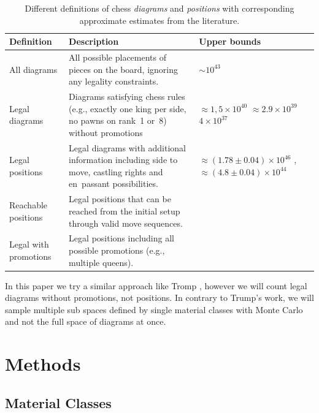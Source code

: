 \documentclass[12pt]{article}
\begin{document}
\begin{table}[h!]
\centering
\renewcommand{\arraystretch}{1.3}
\begin{tabular}{p{3.8cm} p{6.2cm} p{4.9cm}}
\toprule
\textbf{Definition} & \textbf{Description} & \textbf{Upper bounds} \\
\midrule
All diagrams & All possible placements of pieces on the board, ignoring any legality constraints. 
& $\sim 10^{43}$ \cite{shannon1950} \\[0.3em]

Legal diagrams & Diagrams satisfying chess rules (e.g., exactly one king per side, no pawns on rank~1 or~8) without promotions 
& $\approx 1,5\times10^{40}$ \cite{steinerberger2015} $\approx 2.9\times10^{39}$ \cite{tromp2021b} $4\times 10^{37}$ \cite{gourion2021} \\[0.3em]

Legal positions & Legal diagrams with additional information including side to move, castling rights and en~passant possibilities. 
& $\approx (1.78\pm0.04)\times10^{46}$ \cite{chinchalkar1996} , $\approx (4.8\pm0.04)\times10^{44}$ \cite{tromp2021b} \\[0.3em]

Reachable positions & Legal positions that can be reached from the initial setup through valid move sequences. 
&  \\[0.3em]

Legal with promotions & Legal positions including all possible promotions (e.g., multiple queens). 
& \\
\bottomrule
\end{tabular}
\caption{Different definitions of chess \textit{diagrams} and \textit{positions} with corresponding approximate estimates from the literature.}
\label{tab:definitions}
\end{table}

In this paper we try a similar approach like Tromp \cite{tromp2021b}, however we will count legal diagrams without promotions, not positions. In contrary to Trump's work, we will sample multiple sub spaces defined by single material classes with Monte Carlo and not the full space of diagrams at once.


\section{Methods}

\subsection{Material Classes}
\end{document}
